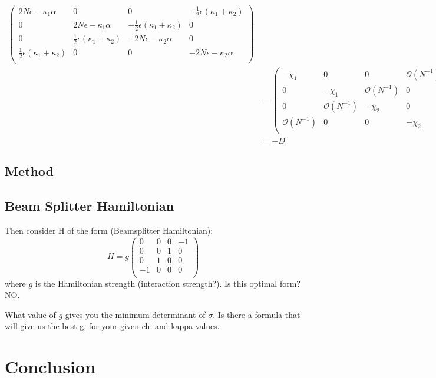 \documentclass[11pt,a4paper]{article}
\numberwithin{equation}{section}
\begin{document}
\begin{align*}
\begin{pmatrix}
	2N \epsilon - \kappa_1 \alpha & 0 & 0 & -\frac{1}{2} \epsilon (\kappa_1 + \kappa_2)\\
	0 & 2N \epsilon - \kappa_1 \alpha & -\frac{1}{2} \epsilon (\kappa_1 + \kappa_2) & 0 \\
	0 & \frac{1}{2} \epsilon (\kappa_1 + \kappa_2) & -2N \epsilon - \kappa_2 \alpha & 0\\
	\frac{1}{2} \epsilon (\kappa_1 + \kappa_2) & 0 & 0 & -2N \epsilon - \kappa_2 \alpha\\
	\end{pmatrix}&\\
	&= \begin{pmatrix}
	-\chi_1 & 0 & 0 & \mathcal{O}(N^{-1})\\
	0 & -\chi_1 & \mathcal{O}(N^{-1}) & 0 \\
	0 & \mathcal{O}(N^{-1}) & -\chi_2 & 0\\
	\mathcal{O}(N^{-1}) & 0 & 0 & -\chi_2\\
	\end{pmatrix}&\\
	&= -D& \tag*{so $\sigma$ is the steady state solution in the asymptotic limit.}
	\end{align*}
	\fi
	
	\color{red}\subsection{Method}
	
	
		
	\subsection{Beam Splitter Hamiltonian}

	
	Then consider H of the form (Beamsplitter Hamiltonian):
	\begin{equation*}
	H = g\begin{pmatrix}
	0 & 0 & 0 & -1\\
	0 & 0 & 1 & 0\\
	0 & 1 & 0 & 0 \\
	-1 & 0 & 0 & 0 \\
	\end{pmatrix}
	\end{equation*} where $g$ is the Hamiltonian strength (interaction strength?). Is this optimal form? NO.
	
	What value of $g$ gives you the minimum determinant of $\sigma$. Is there a formula that will give us the best g, for your given chi and kappa values. 
	

	\section{Conclusion}
	\label{sec:conc}
	\color{black}
	
	
	
	
	
	
\end{document}
